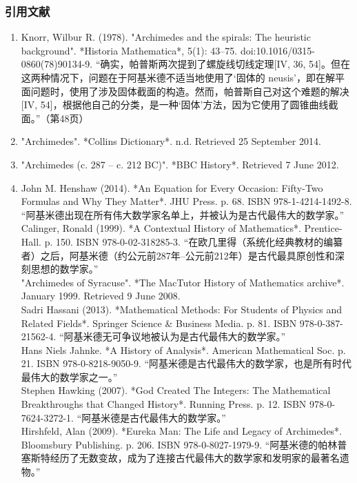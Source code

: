 \subsubsection{引用文献}  
\begin{enumerate}
\item Knorr, Wilbur R. (1978). "Archimedes and the spirals: The heuristic background". *Historia Mathematica*, 5(1): 43–75. doi:10.1016/0315-0860(78)90134-9.  
  “确实，帕普斯两次提到了螺旋线切线定理[IV, 36, 54]。但在这两种情况下，问题在于阿基米德不适当地使用了‘固体的 neusis’，即在解平面问题时，使用了涉及固体截面的构造。然而，帕普斯自己对这个难题的解决[IV, 54]，根据他自己的分类，是一种‘固体’方法，因为它使用了圆锥曲线截面。”（第48页）
\item "Archimedes". *Collins Dictionary*. n.d. Retrieved 25 September 2014.
\item "Archimedes (c. 287 – c. 212 BC)". *BBC History*. Retrieved 7 June 2012.
\item John M. Henshaw (2014). *An Equation for Every Occasion: Fifty-Two Formulas and Why They Matter*. JHU Press. p. 68. ISBN 978-1-4214-1492-8.  
  “阿基米德出现在所有伟大数学家名单上，并被认为是古代最伟大的数学家。”\\
Calinger, Ronald (1999). *A Contextual History of Mathematics*. Prentice-Hall. p. 150. ISBN 978-0-02-318285-3.  
  “在欧几里得（系统化经典教材的编纂者）之后，阿基米德（约公元前287年–公元前212年）是古代最具原创性和深刻思想的数学家。”\\
"Archimedes of Syracuse". *The MacTutor History of Mathematics archive*. January 1999. Retrieved 9 June 2008.\\
Sadri Hassani (2013). *Mathematical Methods: For Students of Physics and Related Fields*. Springer Science & Business Media. p. 81. ISBN 978-0-387-21562-4.  
  “阿基米德无可争议地被认为是古代最伟大的数学家。”\\
Hans Niels Jahnke. *A History of Analysis*. American Mathematical Soc. p. 21. ISBN 978-0-8218-9050-9.  
  “阿基米德是古代最伟大的数学家，也是所有时代最伟大的数学家之一。”\\
Stephen Hawking (2007). *God Created The Integers: The Mathematical Breakthroughs that Changed History*. Running Press. p. 12. ISBN 978-0-7624-3272-1.  
  “阿基米德是古代最伟大的数学家。”\\
Hirshfeld, Alan (2009). *Eureka Man: The Life and Legacy of Archimedes*. Bloomsbury Publishing. p. 206. ISBN 978-0-8027-1979-9.  
  “阿基米德的帕林普塞斯特经历了无数变故，成为了连接古代最伟大的数学家和发明家的最著名遗物。”\\

\end{enumerate}

